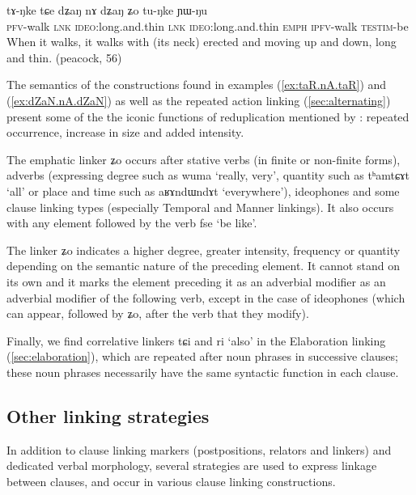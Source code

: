 \documentclass[oldfontcommands,oneside,a4paper,11pt]{article}
\newcommand{\ipa}[1]{{\phon \mbox{#1}}} %
\newcommand{\refb}[1]{(\ref{#1})}
\begin{document}
 \begin{exe}
\ex \label{ex:dZaN.nA.dZaN} 
\gll
\ipa{tɤ-ŋke}   	\ipa{tɕe}   	\ipa{dʑaŋ} \ipa{nɤ}   	\ipa{dʑaŋ}   	\ipa{ʑo}   	\ipa{tu-ŋke}   	\ipa{ɲɯ-ŋu}   \\
\textsc{pfv}-walk \textsc{lnk} \textsc{ideo}:long.and.thin \textsc{lnk}  \textsc{ideo}:long.and.thin \textsc{emph} \textsc{ipfv}-walk \textsc{testim}-be \\
\glt When it walks, it walks with (its neck) erected and moving up and down, long and thin. (peacock, 56)
\end{exe}

The semantics of the constructions found in examples \refb{ex:taR.nA.taR}  and \refb{ex:dZaN.nA.dZaN} as well as the   repeated action linking  \refb{sec:alternating} present some of the the iconic functions of reduplication mentioned by \citet[76]{sapir21lg}: repeated occurrence, increase in size and added intensity.

The emphatic linker \ipa{ʑo} occurs after stative verbs (in finite or non-finite forms), adverbs (expressing degree such as \ipa{wuma} `really, very', quantity such as \ipa{tʰamtɕɤt} `all' or place and time such as \ipa{aʁɤndɯndɤt} `everywhere'),  ideophones and some clause linking types (especially Temporal and Manner linkings). It also occurs with any element followed by the verb \ipa{fse} `be like'. 

The linker \ipa{ʑo} indicates a higher degree, greater  intensity, frequency or quantity depending on the semantic nature of the preceding element. It cannot stand on its own  and it marks   the element preceding it as an adverbial modifier as an adverbial modifier of the following verb, except in the case of ideophones (which can appear, followed by \ipa{ʑo}, after the verb that they modify).


Finally, we find correlative linkers   \ipa{tɕi} and \ipa{ri} `also' in the Elaboration linking \refb{sec:elaboration}, which are repeated after  noun phrases in successive clauses; these noun phrases necessarily have the same syntactic function in each clause.



\subsection{Other linking strategies}
In addition to clause linking markers (postpositions, relators and linkers) and dedicated verbal morphology, several strategies are used to express linkage between clauses, and occur in various clause linking constructions.  
\end{document}
